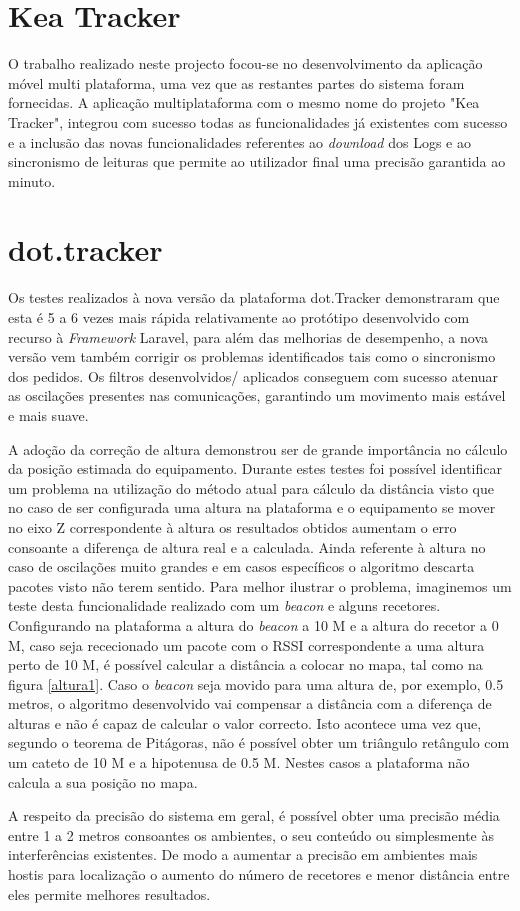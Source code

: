 \section{Kea Tracker}

\par O trabalho realizado neste projecto focou-se no desenvolvimento da aplicação móvel multi plataforma, uma vez que as restantes partes do sistema foram fornecidas. A aplicação multiplataforma com o mesmo nome do projeto "Kea Tracker", integrou com sucesso todas as funcionalidades já existentes com sucesso e a inclusão das novas funcionalidades  referentes ao \textit{download} dos Logs e ao sincronismo de leituras que permite ao utilizador final uma precisão garantida ao minuto.

\section{dot.tracker}

\par Os testes realizados à nova versão da plataforma dot.Tracker demonstraram que esta é 5 a 6 vezes mais rápida relativamente ao protótipo desenvolvido com recurso à \textit{Framework} Laravel, para além das melhorias de desempenho, a nova versão vem também corrigir os problemas identificados tais como o sincronismo dos pedidos. Os filtros desenvolvidos/ aplicados conseguem com sucesso atenuar as oscilações presentes nas comunicações, garantindo um movimento mais estável e mais suave. 
\par  A adoção da correção de altura demonstrou ser de grande importância no cálculo da posição estimada do equipamento. Durante estes testes foi possível identificar um problema na utilização do método atual para cálculo da distância visto que no caso de ser configurada uma altura na plataforma e o equipamento se mover no eixo Z correspondente à altura os resultados obtidos aumentam o erro consoante a diferença de altura real e a calculada.  Ainda referente à altura no caso de oscilações muito grandes  e em casos específicos o algoritmo descarta pacotes visto não terem sentido. Para melhor ilustrar o problema, imaginemos um teste desta funcionalidade realizado com um \textit{beacon} e alguns recetores. Configurando na plataforma a altura do \textit{beacon} a 10 M e a altura do recetor a 0 M, caso seja rececionado um pacote com o RSSI correspondente a uma altura  perto de 10 M, é possível calcular a distância a colocar no mapa, tal como na figura \ref{altura1}. Caso o \textit{beacon} seja movido para uma altura de, por exemplo, 0.5 metros, o algoritmo desenvolvido vai compensar a distância com a diferença de alturas e não é capaz de calcular o valor correcto. Isto acontece uma vez que, segundo o teorema de Pitágoras, não é possível obter um triângulo retângulo com um cateto de 10 M e a hipotenusa de 0.5 M. Nestes casos a plataforma não calcula  a sua posição no mapa.
\par A respeito da precisão do sistema em geral, é possível obter uma precisão média entre 1 a 2 metros  consoantes os ambientes, o seu conteúdo ou simplesmente às interferências existentes. De modo a aumentar a  precisão em ambientes mais hostis para localização o aumento do número de recetores e menor distância entre eles permite melhores resultados.